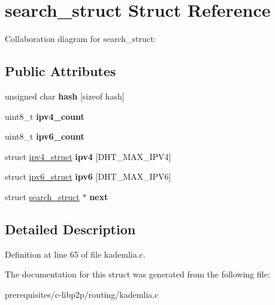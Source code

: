 \hypertarget{structsearch__struct}{}\section{search\+\_\+struct Struct Reference}
\label{structsearch__struct}


Collaboration diagram for search\+\_\+struct\+:
\subsection*{Public Attributes}
\begin{DoxyCompactItemize}
\item 
\mbox{\label{structsearch__struct_a5f670f69222d0e0981c78b1ae9439cb2}} 
unsigned char {\bfseries hash} \mbox{[}sizeof hash\mbox{]}
\item 
\mbox{\label{structsearch__struct_adb651f0d52f69791090ddffe86ed7afd}} 
uint8\+\_\+t {\bfseries ipv4\+\_\+count}
\item 
\mbox{\label{structsearch__struct_af51e2b8209e5e573050ce140c6c143c8}} 
uint8\+\_\+t {\bfseries ipv6\+\_\+count}
\item 
\mbox{\label{structsearch__struct_a951a15ae4f80f6c10adc6982feb8a7e3}} 
struct \mbox{\hyperlink{structipv4__struct}{ipv4\+\_\+struct}} {\bfseries ipv4} \mbox{[}D\+H\+T\+\_\+\+M\+A\+X\+\_\+\+I\+P\+V4\mbox{]}
\item 
\mbox{\label{structsearch__struct_a2b5ed197b5e5f7c614b1bf7f1a7d65af}} 
struct \mbox{\hyperlink{structipv6__struct}{ipv6\+\_\+struct}} {\bfseries ipv6} \mbox{[}D\+H\+T\+\_\+\+M\+A\+X\+\_\+\+I\+P\+V6\mbox{]}
\item 
\mbox{\label{structsearch__struct_a2981e03213796084c77df5d4840b1af5}} 
struct \mbox{\hyperlink{structsearch__struct}{search\+\_\+struct}} $\ast$ {\bfseries next}
\end{DoxyCompactItemize}


\subsection{Detailed Description}


Definition at line 65 of file kademlia.\+c.



The documentation for this struct was generated from the following file\+:\begin{DoxyCompactItemize}
\item 
prerequisites/c-\/libp2p/routing/kademlia.\+c\end{DoxyCompactItemize}
